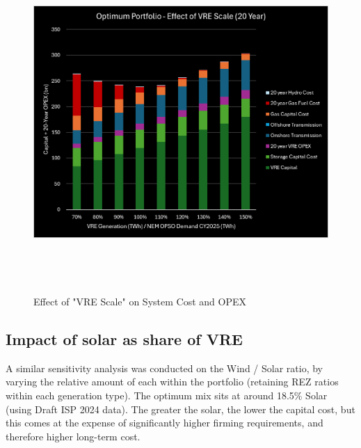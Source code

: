 \documentclass[
  letterpaper,
  DIV=11,
  numbers=noendperiod]{scrartcl}
\begin{document}
\begin{figure}[H]

{\centering \includegraphics[width=6.46042in,height=5.08681in]{./media/media/image14.png}

}

\caption{Effect of "VRE Scale" on System Cost and OPEX}

\end{figure}%

\subsection{Impact of solar as share of
VRE}\label{impact-of-solar-as-share-of-vre}

A similar sensitivity analysis was conducted on the Wind / Solar ratio,
by varying the relative amount of each within the portfolio (retaining
REZ ratios within each generation type). The optimum mix sits at around
18.5\% Solar (using Draft ISP 2024 data). The greater the solar, the
lower the capital cost, but this comes at the expense of significantly
higher firming requirements, and therefore higher long-term cost.
\end{document}
